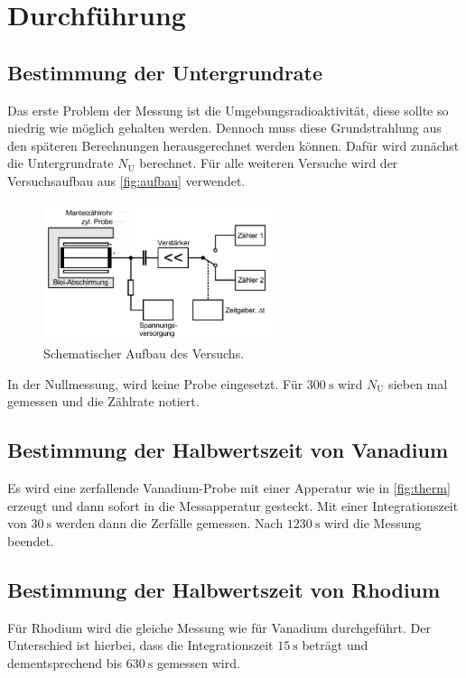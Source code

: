 \section{Durchführung}
\label{sec:Durchführung}


\subsection{Bestimmung der Untergrundrate}
\label{ssec:d1}

Das erste Problem der Messung ist die Umgebungsradioaktivität, diese sollte so niedrig wie möglich gehalten werden.
Dennoch muss diese Grundstrahlung aus den späteren Berechnungen herausgerechnet werden können. 
Dafür wird zunächst die Untergrundrate $N_\text{U}$ berechnet. 
Für alle weiteren Versuche wird der Versuchsaufbau aus \autoref{fig:aufbau} verwendet.

\begin{figure}
    \centering
    \includegraphics[width=0.6\textwidth]{images/bild3.png}
    \caption{Schematischer Aufbau des Versuchs.}
    \label{fig:aufbau}
\end{figure}

In der Nullmessung, wird keine Probe eingesetzt.
Für $\SI{300}{\second}$ wird $N_\text{U}$ sieben mal gemessen und die Zählrate notiert.

\subsection{Bestimmung der Halbwertszeit von Vanadium}
\label{ssec:d2}

Es wird eine zerfallende Vanadium-Probe mit einer Apperatur wie in \autoref{fig:therm} erzeugt und dann sofort in die Messapperatur gesteckt. 
Mit einer Integrationszeit von $\SI{30}{\second}$ werden dann die Zerfälle gemessen.
Nach $\SI{1230}{\second}$ wird die Messung beendet.

\subsection{Bestimmung der Halbwertszeit von Rhodium}
\label{ssec:d3}

Für Rhodium wird die gleiche Messung wie für Vanadium durchgeführt.
Der Unterschied ist hierbei, dass die Integrationszeit $\SI{15}{\second}$ beträgt und dementsprechend bis $\SI{630}{\second}$ gemessen wird.
